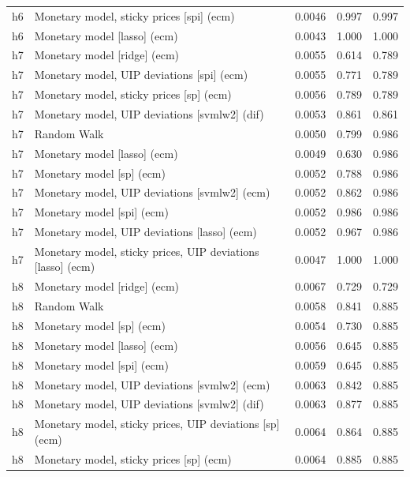 \begin{ThreePartTable}
\begin{longtable}[t]{cp{5.5cm}ccc}
h6 & \raggedright Monetary model, sticky prices [spi] (ecm) & 0.0046 & 0.997 & 0.997\\
h6 & \raggedright Monetary model [lasso] (ecm) & 0.0043 & 1.000 & 1.000\\
\addlinespace
h7 & \raggedright Monetary model [ridge] (ecm) & 0.0055 & 0.614 & 0.789\\
h7 & \raggedright Monetary model, UIP deviations [spi] (ecm) & 0.0055 & 0.771 & 0.789\\
h7 & \raggedright Monetary model, sticky prices [sp] (ecm) & 0.0056 & 0.789 & 0.789\\
h7 & \raggedright Monetary model, UIP deviations [svmlw2] (dif) & 0.0053 & 0.861 & 0.861\\
h7 & \raggedright Random Walk & 0.0050 & 0.799 & 0.986\\
h7 & \raggedright Monetary model [lasso] (ecm) & 0.0049 & 0.630 & 0.986\\
h7 & \raggedright Monetary model [sp] (ecm) & 0.0052 & 0.788 & 0.986\\
h7 & \raggedright Monetary model, UIP deviations [svmlw2] (ecm) & 0.0052 & 0.862 & 0.986\\
h7 & \raggedright Monetary model [spi] (ecm) & 0.0052 & 0.986 & 0.986\\
h7 & \raggedright Monetary model, UIP deviations [lasso] (ecm) & 0.0052 & 0.967 & 0.986\\
h7 & \raggedright Monetary model, sticky prices, UIP deviations [lasso] (ecm) & 0.0047 & 1.000 & 1.000\\
\addlinespace
h8 & \raggedright Monetary model [ridge] (ecm) & 0.0067 & 0.729 & 0.729\\
h8 & \raggedright Random Walk & 0.0058 & 0.841 & 0.885\\
h8 & \raggedright Monetary model [sp] (ecm) & 0.0054 & 0.730 & 0.885\\
h8 & \raggedright Monetary model [lasso] (ecm) & 0.0056 & 0.645 & 0.885\\
h8 & \raggedright Monetary model [spi] (ecm) & 0.0059 & 0.645 & 0.885\\
h8 & \raggedright Monetary model, UIP deviations [svmlw2] (ecm) & 0.0063 & 0.842 & 0.885\\
h8 & \raggedright Monetary model, UIP deviations [svmlw2] (dif) & 0.0063 & 0.877 & 0.885\\
h8 & \raggedright Monetary model, sticky prices, UIP deviations [sp] (ecm) & 0.0064 & 0.864 & 0.885\\
h8 & \raggedright Monetary model, sticky prices [sp] (ecm) & 0.0064 & 0.885 & 0.885\\

\end{longtable}
\end{ThreePartTable}
